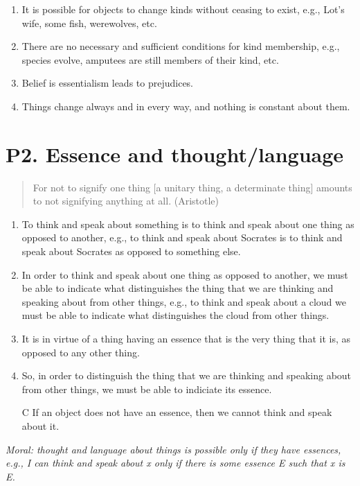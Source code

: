 \documentclass[article,oneside]{memoir}
\begin{document}
\begin{enumerate}
\item It is possible for objects to change kinds without ceasing to exist, e.g., Lot's wife, some fish, werewolves, etc.
\item There are no necessary and sufficient conditions for kind membership, e.g., species evolve, amputees are still members of their kind, etc.
\item Belief is essentialism leads to prejudices. 
\item Things change always and in every way, and nothing is constant about them.
\end{enumerate}

\section{P2. Essence and thought/language}
\begin{quotation}
For not to signify one thing [a unitary thing, a determinate thing] amounts to not signifying anything at all. (Aristotle)
\end{quotation}


\begin{enumerate}
\item To think and speak about something is to think and speak about one thing as opposed to another, e.g., to think and speak about Socrates is to think and speak about Socrates as opposed to something else. 
\item  In order to think and speak about one thing as opposed to another, we must be able to indicate what distinguishes the thing that we are thinking and speaking about from other things, e.g., to think and speak about a cloud we must be able to indicate what distinguishes the cloud from other things.  
\item It is in virtue of a thing having an essence that is the very thing that it is, as opposed to any other thing.
\item So, in order to distinguish the thing that we are thinking and speaking about from other things, we must be able to indiciate its essence. 
\item[C] If an object does not have an essence, then we cannot think and speak about it. 
\end{enumerate}


\noindent \emph{Moral: thought and language about things is possible only if they have essences, e.g., I can think and speak about x only if there is some essence E such that x is E.}
\end{document}
